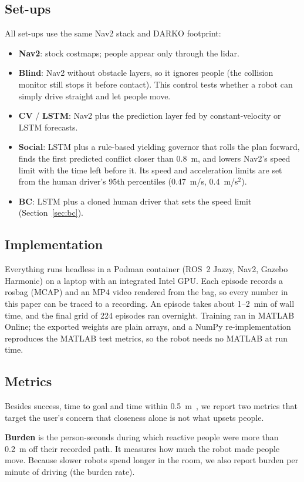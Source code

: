 \documentclass[conference]{IEEEtran}
\begin{document}
\subsection{Set-ups}
All set-ups use the same Nav2 stack and DARKO footprint:
\begin{itemize}
\item \textbf{Nav2}: stock costmaps; people appear only through the lidar.
\item \textbf{Blind}: Nav2 without obstacle layers, so it ignores people (the collision monitor still stops it before contact). This control tests whether a robot can simply drive straight and let people move.
\item \textbf{CV} / \textbf{LSTM}: Nav2 plus the prediction layer fed by constant-velocity or LSTM forecasts.
\item \textbf{Social}: LSTM plus a rule-based yielding governor that rolls the plan forward, finds the first predicted conflict closer than 0.8~m, and lowers Nav2's speed limit with the time left before it. Its speed and acceleration limits are set from the human driver's 95th percentiles (0.47~m/s, 0.4~m/s$^2$).
\item \textbf{BC}: LSTM plus a cloned human driver that sets the speed limit (Section~\ref{sec:bc}).
\end{itemize}

\subsection{Implementation}
Everything runs headless in a Podman container (ROS~2 Jazzy, Nav2, Gazebo Harmonic) on a laptop with an integrated Intel GPU. Each episode records a rosbag (MCAP) and an MP4 video rendered from the bag, so every number in this paper can be traced to a recording. An episode takes about 1--2~min of wall time, and the final grid of 224 episodes ran overnight. Training ran in MATLAB Online; the exported weights are plain arrays, and a NumPy re-implementation reproduces the MATLAB test metrics, so the robot needs no MATLAB at run time.

\subsection{Metrics}
Besides success, time to goal and time within 0.5~m~\cite{hall1966hidden}, we report two metrics that target the user's concern that closeness alone is not what upsets people.

\textbf{Burden} is the person-seconds during which reactive people were more than 0.2~m off their recorded path. It measures how much the robot made people move. Because slower robots spend longer in the room, we also report burden per minute of driving (the burden rate).
\end{document}
